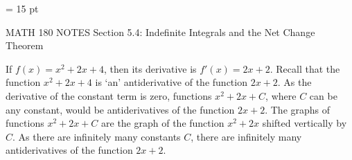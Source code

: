 \documentclass[12pt,letterpaper]{article}
\begin{document}
\thispagestyle{empty}

\baselineskip = 15 pt %


MATH 180 NOTES \hfill Section 5.4: Indefinite Integrals and the Net Change Theorem

\hrulefill

If $f(x) = x^2 + 2x + 4$, then its derivative is $f'(x) = 2x + 2$. Recall that the function $x^2 + 2x + 4$ is `an' antiderivative of the function $2x + 2$. As the derivative of the constant term is zero, functions $x^2 + 2x + C$, where $C$ can be any constant, would be antiderivatives of the function $2x + 2$. The graphs of functions $x^2 + 2x + C$ are the graph of the function $x^2 + 2x$ shifted vertically by $C$. As there are infinitely many constants $C$, there are infinitely many antiderivatives of the function $2x + 2$.
\end{document}
